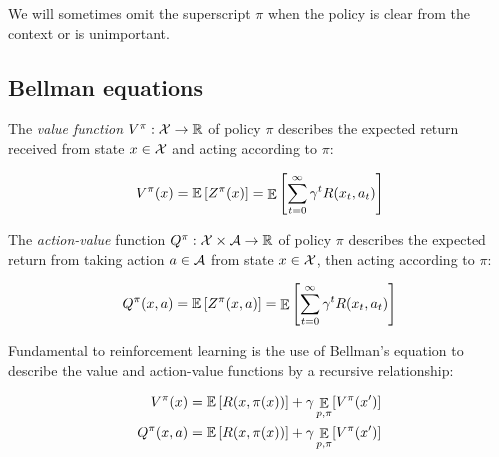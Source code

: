 We will sometimes omit the superscript $\pi$ when the policy is clear from the context or is unimportant.

\subsection{Bellman equations}

The \textit{value function} $V^\pi : \mathcal{X}\to\mathbb{R}$ of policy $\pi$ describes the expected return received from state $x \in \mathcal{X}$ and acting according to $\pi$:

\begin{equation}
V^\pi(x) = \mathbb{E}\left[ { Z^\pi(x)} \right] = \mathop{\mathbb{E}}\left[\sum_{t=0}^\infty \gamma^tR(x_t,a_t) \right]
\end{equation}


The \textit{action-value} function $Q^\pi : \mathcal{X}\times\mathcal{A}\to\mathbb{R}$ of policy $\pi$ describes the expected return from taking action $a \in \mathcal{A}$ from state $x \in \mathcal{X}$, then acting according to $\pi$:

\begin{equation}
Q^\pi(x, a) = \mathbb{E}\left[ {Z^\pi(x, a)} \right] = \mathop{\mathbb{E}}\left[ \sum_{t=0}^\infty \gamma^tR(x_t,a_t) \right]
\end{equation}

Fundamental to reinforcement learning is the use of Bellman’s equation \citep{bellman1957markovian} to describe the value and action-value functions by a recursive relationship:

\begin{align}
V^\pi(x) &= \mathbb{E}\left[ { R(x, \pi(x))} \right] + \gamma \mathop{\mathbb{E}}\limits_{p, \pi}[ V^\pi(x')]\\
Q^\pi(x, a) &= \mathbb{E}\left[ { R(x, \pi(x))} \right] + \gamma \mathop{\mathbb{E}}_{p, \pi}[ V^\pi(x')]
\end{align}

